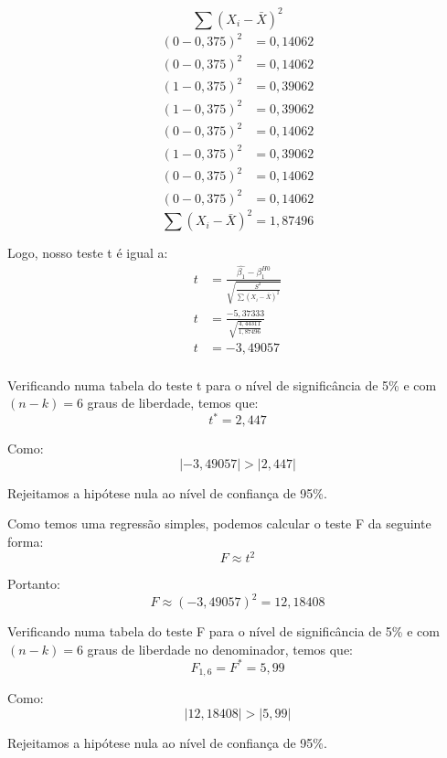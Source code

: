 \documentclass[]{ufpe-exercises}
\begin{document}
\begin{questions}
\begin{parts}
\begin{solution}
			\[ \sum (X_{i} - \bar{X})^{2} \]
			\begin{align*}
				(0 - 0,375)^{2} & = 0,14062 \\
				(0 - 0,375)^{2} & = 0,14062 \\
				(1 - 0,375)^{2} & = 0,39062 \\
				(1 - 0,375)^{2} & = 0,39062 \\
				(0 - 0,375)^{2} & = 0,14062 \\
				(1 - 0,375)^{2} & = 0,39062 \\
				(0 - 0,375)^{2} & = 0,14062 \\
				(0 - 0,375)^{2} & = 0,14062
			\end{align*}
			\[ \sum (X_{i} - \bar{X})^{2} = 1,87496\]

			Logo, nosso teste t é igual a:
			\begin{align*}
				t & = \frac{\hat{\beta_{1}} - \beta^{H0}_{1}}{\sqrt{\frac{S^{2}}{\sum (X_{i} - \bar{X})^{2}}}} \\
				t & = \frac{-5,37333}{\sqrt{\frac{4,44311}{1,87496}}}                                          \\
				t & = -3,49057                                                                                 \\
			\end{align*}

			Verificando numa tabela do teste t para o nível de significância de 5\% e com \((n - k) = 6\) graus de liberdade, temos que:
			\[ t^{*} = 2,447 \]

			Como:
			\[\lvert -3,49057 \rvert > \lvert 2,447 \rvert\]

			Rejeitamos a hipótese nula ao nível de confiança de 95\%.

			Como temos uma regressão simples, podemos calcular o teste F da seguinte forma:
			\[ F \approx t^{2} \]

			Portanto:
			\[ F \approx (-3,49057)^{2} = 12,18408 \]

			Verificando numa tabela do teste F para o nível de significância de 5\% e com \((n - k) = 6\) graus de liberdade no denominador, temos que:
			\[ F_{1,6} = F^{*} = 5,99 \]

			Como:
			\[\lvert 12,18408 \rvert > \lvert 5,99 \rvert\]

			Rejeitamos a hipótese nula ao nível de confiança de 95\%.

		\end{solution}

		\vspace{0.3cm}


\end{parts}
\end{questions}
\end{document}
